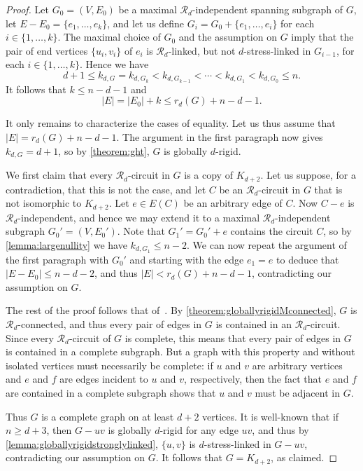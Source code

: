 \documentclass[11pt,a4paper,dvipsnames]{scrartcl}
\theoremstyle{definition}
\newcommand{\stressnullity}[1]{k_{d, #1}}
\newcommand{\globrig}[1]{globally $#1$-rigid}
\newcommand{\strongly}[1]{${#1}$-stress-linked}
\begin{document}
\begin{proof}
    Let $G_0 = (V,E_0)$ be a maximal $\mathcal{R}_d$-independent spanning subgraph of $G$, let $E - E_0 = \{e_1,\ldots,e_k\}$, and let us define $G_i = G_0 + \{e_1,\ldots,e_i\}$ for each $i \in \{1,\ldots,k\}$. The maximal choice of $G_0$ and the assumption on $G$ imply that the pair of end vertices $\{u_i,v_i\}$ of $e_i$ is $\mathcal{R}_d$-linked, but not \strongly{d} in $G_{i-1}$, for each $i \in \{1,\ldots,k\}$. Hence we have
\[d+1 \leq \stressnullity{G} = \stressnullity{G_k} < \stressnullity{G_{k-1}} < \cdots < \stressnullity{G_1} < \stressnullity{G_0} \leq n.\]It follows that $k \leq n-d-1$ and \[|E| = |E_0| + k \leq r_d(G) + n-d-1.\]
    
    It only remains to characterize the cases of equality. Let us thus assume that $|E| = r_d(G) + n - d - 1$.  
    The argument in the first paragraph now gives $\stressnullity{G} = d+1$, so by \cref{theorem:ght}, $G$ is \globrig{d}. 
    
    We first claim that every $\mathcal{R}_d$-circuit in $G$ is a copy of $K_{d+2}$. Let us suppose, for a contradiction, that this is not the case, and let $C$ be an $\mathcal{R}_d$-circuit in $G$ that is not isomorphic to $K_{d+2}$. Let $e \in E(C)$ be an arbitrary edge of $C$. Now $C-e$ is $\mathcal{R}_d$-independent, and hence we may extend it to a maximal $\mathcal{R}_d$-independent subgraph $G_0' = (V,E_0')$. Note that $G_1' = G_0' + e$ contains the circuit $C$, so by \cref{lemma:largenullity} we have $\stressnullity{G_1} \leq n-2$. We can now repeat the argument of the first paragraph with $G_0'$ and starting with the edge $e_1 = e$ to deduce that $|E- E_0| \leq n-d-2$, and thus $|E| < r_d(G) + n-d-1$, contradicting our assumption on $G$.
    
    The rest of the proof follows that of~\cite[Theorem 3.7]{garamvolgyi.jordan_2023}. By \cref{theorem:globallyrigidMconnected}, $G$ is $\mathcal{R}_d$-connected, and thus every pair of edges in $G$ is contained in an $\mathcal{R}_d$-circuit. Since every $\mathcal{R}_d$-circuit of $G$ is complete, this means that every pair of edges in $G$ is contained in a complete subgraph. But a graph with this property and without isolated vertices must  necessarily be complete: if $u$ and $v$ are arbitrary vertices and $e$ and $f$ are edges incident to $u$ and $v$, respectively, then the fact that $e$ and $f$ are contained in a complete subgraph shows that $u$ and $v$ must be adjacent in $G$.
    
    Thus $G$ is a complete graph on at least $d+2$ vertices. It is well-known that if $n \geq d+3$, then $G-uv$ is \globrig{d} for any edge $uv$, and thus by \cref{lemma:globallyrigidstronglylinked}, $\{u,v\}$ is \strongly{d} in $G-uv$, contradicting our assumption on $G$. It follows that $G = K_{d+2}$, as claimed.
\end{proof}
\end{document}
